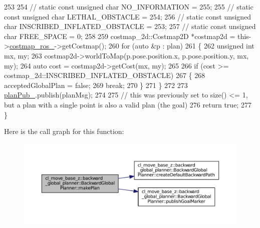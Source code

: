 \begin{DoxyCode}
253 
254     \textcolor{comment}{// static const unsigned char NO\_INFORMATION = 255;}
255     \textcolor{comment}{// static const unsigned char LETHAL\_OBSTACLE = 254;}
256     \textcolor{comment}{// static const unsigned char INSCRIBED\_INFLATED\_OBSTACLE = 253;}
257     \textcolor{comment}{// static const unsigned char FREE\_SPACE = 0;}
258 
259     costmap\_2d::Costmap2D *costmap2d = this->\hyperlink{classcl__move__base__z_1_1backward__global__planner_1_1BackwardGlobalPlanner_a7103c15e6540a514acd421c3c6e194a4}{costmap\_ros\_}->getCostmap();
260     \textcolor{keywordflow}{for} (\textcolor{keyword}{auto} &p : plan)
261     \{
262         \textcolor{keywordtype}{unsigned} \textcolor{keywordtype}{int} mx, my;
263         costmap2d->worldToMap(p.pose.position.x, p.pose.position.y, mx, my);
264         \textcolor{keyword}{auto} cost = costmap2d->getCost(mx, my);
265 
266         \textcolor{keywordflow}{if} (cost >= costmap\_2d::INSCRIBED\_INFLATED\_OBSTACLE)
267         \{
268             acceptedGlobalPlan = \textcolor{keyword}{false};
269             \textcolor{keywordflow}{break};
270         \}
271     \}
272     
273     \hyperlink{classcl__move__base__z_1_1backward__global__planner_1_1BackwardGlobalPlanner_a561eab039140948c52ec928c191f3f43}{planPub\_}.publish(planMsg);
274 
275     \textcolor{comment}{// this was previously set to size() <= 1, but a plan with a single point is also a valid plan (the
       goal)}
276     \textcolor{keywordflow}{return} \textcolor{keyword}{true};
277 \}
\end{DoxyCode}


Here is the call graph for this function\+:
\nopagebreak
\begin{figure}[H]
\begin{center}
\leavevmode
\includegraphics[width=350pt]{classcl__move__base__z_1_1backward__global__planner_1_1BackwardGlobalPlanner_a3f1f3c81e7c52c9305544fd793741a41_cgraph}
\end{center}
\end{figure}




